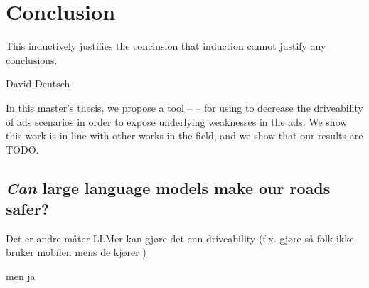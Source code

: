 \chapter{Conclusion}\label{sec:conclusion}

\epigraph{This inductively justifies the conclusion that induction cannot justify any conclusions.}{David Deutsch}

In this master's thesis, we propose a tool -- \hefe -- for using  to decrease the
driveability of \acrfull{ads} scenarios in order to expose underlying weaknesses in the
\acrshort{ads}. We show this work is in line with other works in the field, and we show that our
results are TODO.

\section{\emph{Can} large language models make our roads safer?} %

Det er andre måter LLMer kan gjøre det enn driveability (f.x. gjøre så folk ikke bruker mobilen mens
de kjører )

men ja